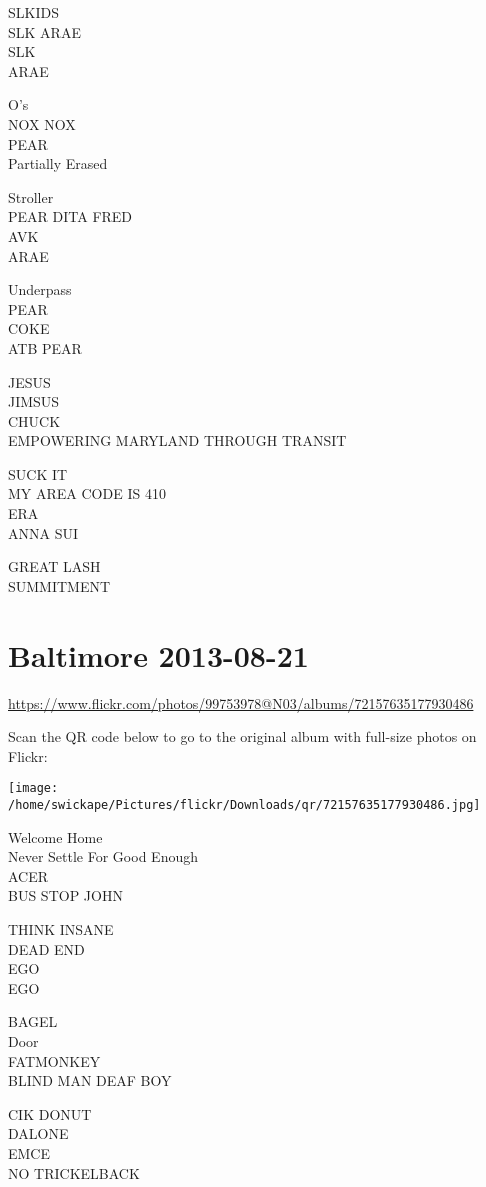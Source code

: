 \documentclass[10pt,letterpaper]{article}
\begin{document}
SLKIDS\\
SLK ARAE\\
SLK\\
ARAE

O's\\
NOX NOX\\
PEAR\\
Partially Erased

Stroller\\
PEAR DITA FRED\\
AVK\\
ARAE

Underpass\\
PEAR\\
COKE\\
ATB PEAR

JESUS\\
JIMSUS\\
CHUCK\\
EMPOWERING MARYLAND THROUGH TRANSIT

SUCK IT\\
MY AREA CODE IS 410\\
ERA\\
ANNA SUI

GREAT LASH\\
SUMMITMENT


\section*{Baltimore 2013-08-21}

\url{https://www.flickr.com/photos/99753978@N03/albums/72157635177930486}

Scan the QR code below to go to the original album with full-size photos on Flickr:

\texttt{[image: /home/swickape/Pictures/flickr/Downloads/qr/72157635177930486.jpg]}


Welcome Home\\
Never Settle For Good Enough\\
ACER\\
BUS STOP JOHN

THINK INSANE\\
DEAD END\\
EGO\\
EGO

BAGEL\\
Door\\
FATMONKEY\\
BLIND MAN DEAF BOY

CIK DONUT\\
DALONE\\
EMCE\\
NO TRICKELBACK
\end{document}
